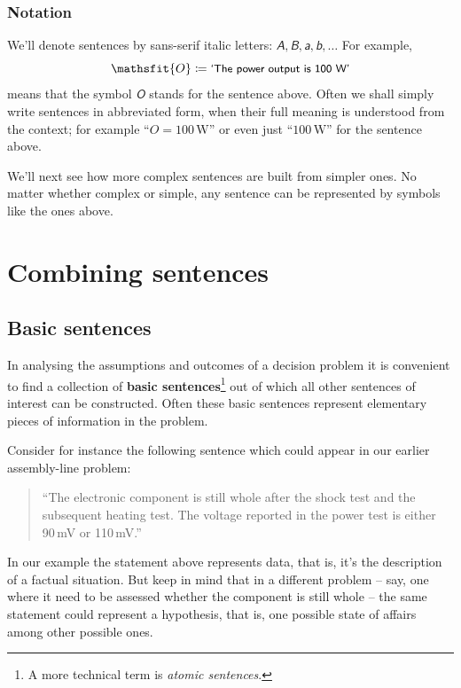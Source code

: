 \documentclass[
  a4paper,
  DIV=11,
  numbers=noendperiod,
  oneside]{scrreprt}
\begin{document}
\hypertarget{notation-1}{%
\subsubsection{Notation}\label{notation-1}}

We'll denote sentences by sans-serif italic letters:
\(\mathsfit{A},\mathsfit{B},\mathsfit{a},\mathsfit{b},\dotsc\) For
example, \[
\mathsfit{O} \coloneqq \textsf{\small`The power output is 100 W'}
\] means that the symbol \(\mathsfit{O}\) stands for the sentence above.
Often we shall simply write sentences in abbreviated form, when their
full meaning is understood from the context; for example
{``\(O = 100\,\mathrm{W}\)''} or even just {``\(100\,\mathrm{W}\)''} for
the sentence above.

We'll next see how more complex sentences are built from simpler ones.
No matter whether complex or simple, any sentence can be represented by
symbols like the ones above.

\hypertarget{combining-sentences}{%
\section{Combining sentences}\label{combining-sentences}}

\hypertarget{basic-sentences}{%
\subsection{Basic sentences}\label{basic-sentences}}

In analysing the assumptions and outcomes of a decision problem it is
convenient to find a collection of {\textbf{basic sentences}}\footnote{A
  more technical term is \emph{atomic sentences}.} out of which all
other sentences of interest can be constructed. Often these basic
sentences represent elementary pieces of information in the problem.

Consider for instance the following sentence which could appear in our
earlier assembly-line problem:

\begin{quote}
``The electronic component is still whole after the shock test and the
subsequent heating test. The voltage reported in the power test is
either 90\,mV or 110\,mV.''
\end{quote}

In our example the statement above represents data, that is, it's the
description of a factual situation. But keep in mind that in a different
problem -- say, one where it need to be assessed whether the component
is still whole -- the same statement could represent a hypothesis, that
is, one possible state of affairs among other possible ones.
\end{document}
